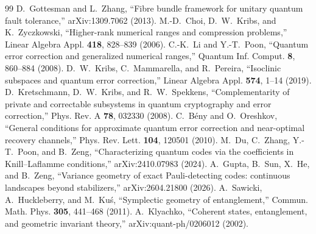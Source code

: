 \documentclass[11pt]{article}
\theoremstyle{definition}
\begin{document}
\begin{thebibliography}{99}\small
{} D.~Gottesman and L.~Zhang, ``Fibre bundle framework for unitary quantum fault tolerance,'' arXiv:1309.7062 (2013).
 M.-D.~Choi, D.~W.~Kribs, and K.~Zyczkowski, ``Higher-rank numerical ranges and compression problems,'' Linear Algebra Appl. \textbf{418}, 828--839 (2006).
 C.-K.~Li and Y.-T.~Poon, ``Quantum error correction and generalized numerical ranges,'' Quantum Inf. Comput. \textbf{8}, 860--884 (2008).
 D.~W.~Kribs, C.~Mammarella, and R.~Pereira, ``Isoclinic subspaces and quantum error correction,'' Linear Algebra Appl. \textbf{574}, 1--14 (2019).
 D.~Kretschmann, D.~W.~Kribs, and R.~W.~Spekkens, ``Complementarity of private and correctable subsystems in quantum cryptography and error correction,'' Phys. Rev. A \textbf{78}, 032330 (2008).
 C.~B\'eny and O.~Oreshkov, ``General conditions for approximate quantum error correction and near-optimal recovery channels,'' Phys. Rev. Lett. \textbf{104}, 120501 (2010).
 M.~Du, C.~Zhang, Y.-T.~Poon, and B.~Zeng, ``Characterizing quantum codes via the coefficients in Knill--Laflamme conditions,'' arXiv:2410.07983 (2024).
 A.~Gupta, B.~Sun, X.~He, and B.~Zeng, ``Variance geometry of exact Pauli-detecting codes: continuous landscapes beyond stabilizers,'' arXiv:2604.21800 (2026).
 A.~Sawicki, A.~Huckleberry, and M.~Ku\'s, ``Symplectic geometry of entanglement,'' Commun. Math. Phys. \textbf{305}, 441--468 (2011).
 A.~Klyachko, ``Coherent states, entanglement, and geometric invariant theory,'' arXiv:quant-ph/0206012 (2002).
\end{thebibliography}
\end{document}
